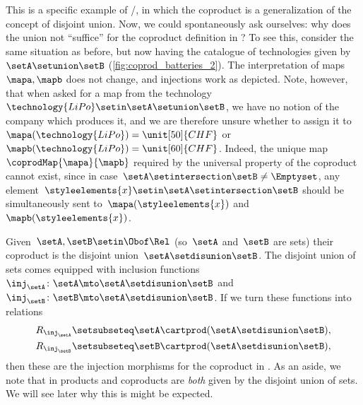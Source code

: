 \begin{example}
    This is a specific example of \Set/\FinSet, in which the coproduct is a generalization of the concept of disjoint union.
    Now, we could spontaneously ask ourselves: why does the union not ``suffice'' for the coproduct definition in \Set?
    To see this, consider the same situation as before, but now having the catalogue of technologies given by~$\setA\setunion \setB$ (\cref{fig:coprod_batteries_2}).
    The interpretation of maps~$\mapa,\mapb$ does not change, and injections work as depicted.
    Note, however, that when asked for a map from the technology~$\technology{LiPo}\setin \setA\setunion \setB$, we have no notion of the company which produces it, and we are therefore unsure whether to assign it to~$\mapa(\technology{LiPo})=\unit[50]{CHF}$ or~$\mapb(\technology{LiPo})=\unit[60]{CHF}$.
    Indeed, the unique map~$\coprodMap{\mapa}{\mapb}$ required by the universal property of the coproduct cannot exist, since in case~$\setA\setintersection \setB\neq \Emptyset$, any element~$\styleelements{x}\setin \setA\setintersection \setB$ should be simultaneously sent to~$\mapa(\styleelements{x})$ and~$\mapb(\styleelements{x})$.
\end{example}


\begin{example}
    Given~$\setA,\setB\setin \Obof\Rel$ (so~$\setA$ and~$\setB$ are sets) their coproduct is the disjoint union~$\setA \setdisunion \setB$.
    The disjoint union of sets comes equipped with inclusion functions~$\inj_\setA\colon \setA\mto \setA \setdisunion\setB$ and~$\inj_\setB\colon \setB\mto \setA \setdisunion\setB$.
    If we turn these functions into relations
    \begin{align}
        R_{\inj_\setA} & \setsubseteq \setA\cartprod (\setA \setdisunion\setB), \\
        R_{\inj_\setB} & \setsubseteq \setB\cartprod (\setA \setdisunion\setB),
    \end{align}
    then these are the injection morphisms for the coproduct in \Rel.
    As an aside, we note that in \Rel products and coproducts are \emph{both} given by the disjoint union of sets.
    We will see later why this is might be expected.
\end{example}

